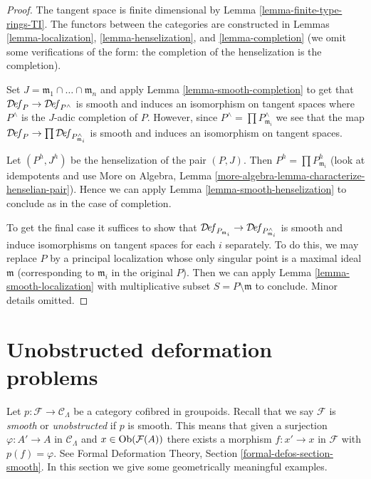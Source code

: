 \begin{proof}
The tangent space is finite dimensional by
Lemma \ref{lemma-finite-type-rings-TI}.
The functors between the categories are constructed
in Lemmas \ref{lemma-localization}, \ref{lemma-henselization}, and
\ref{lemma-completion} (we omit some verifications of the form:
the completion of the henselization is the completion).

\medskip\noindent
Set $J = \mathfrak m_1 \cap \ldots \cap \mathfrak m_n$ and apply
Lemma \ref{lemma-smooth-completion} to get that
$\mathcal{D}\!\mathit{ef}_P \to \mathcal{D}\!\mathit{ef}_{P^\wedge}$
is smooth and induces an isomorphism on tangent spaces
where $P^\wedge$ is the $J$-adic completion of $P$.
However, since $P^\wedge = \prod P_{\mathfrak m_i}^\wedge$
we see that the map $\mathcal{D}\!\mathit{ef}_P \to
\prod \mathcal{D}\!\mathit{ef}_{P_{\mathfrak m_i}^\wedge}$
is smooth and induces an isomorphism on tangent spaces.

\medskip\noindent
Let $(P^h, J^h)$ be the henselization of the pair $(P, J)$.
Then $P^h = \prod P_{\mathfrak m_i}^h$ (look at idempotents
and use More on Algebra, Lemma
\ref{more-algebra-lemma-characterize-henselian-pair}).
Hence we can apply Lemma \ref{lemma-smooth-henselization}
to conclude as in the case of completion.

\medskip\noindent
To get the final case it suffices to show that
$\mathcal{D}\!\mathit{ef}_{P_{\mathfrak m_i}} \to
\mathcal{D}\!\mathit{ef}_{P_{\mathfrak m_i}^\wedge}$
is smooth and induce isomorphisms on tangent spaces for each $i$ separately.
To do this, we may replace $P$ by a principal localization
whose only singular point is a maximal ideal $\mathfrak m$
(corresponding to $\mathfrak m_i$ in the original $P$).
Then we can apply
Lemma \ref{lemma-smooth-localization}
with multiplicative subset $S = P \setminus \mathfrak m$ to conclude.
Minor details omitted.
\end{proof}






\section{Unobstructed deformation problems}
\label{section-unobstructed}

\noindent
Let $p : \mathcal{F} \to \mathcal{C}_\Lambda$ be a
category cofibred in groupoids. Recall that we say $\mathcal{F}$
is {\it smooth} or {\it unobstructed} if $p$ is smooth.
This means that given a surjection $\varphi : A' \to A$ in
$\mathcal{C}_\Lambda$ and $x \in \mathop{\mathrm{Ob}}\nolimits(\mathcal{F}(A))$
there exists a morphism $f : x' \to x$ in $\mathcal{F}$
with $p(f) = \varphi$.
See Formal Deformation Theory, Section \ref{formal-defos-section-smooth}.
In this section we give some geometrically meaningful examples.

